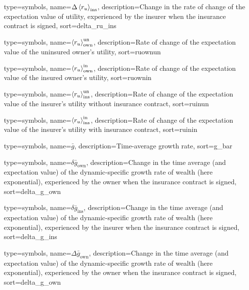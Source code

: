 {
 type={symbols}, 
 name={\ensuremath{\Delta \ave{r_u}_{\text{ins}}}},
 description={Change in the rate of change of the expectation value of utility, experienced by the insurer when the insurance contract is signed},
 sort=delta_ru_ins
}

{
  type={symbols}, 
  name={\ensuremath{\ave{r_u}_{\text{own}}^{\text{un}}}},
  description={Rate of change of the expectation value of the uninsured owner's utility},
  sort=ruownun
}

{
  type={symbols}, 
  name={\ensuremath{\ave{r_u}_{\text{own}}^{\text{in}}}},
  description={Rate of change of the expectation value of the insured owner's utility},
  sort=ruownin
}


{
  type={symbols}, 
  name={\ensuremath{\ave{r_u}_{\text{ins}}^{\text{un}}}},
  description={Rate of change of the expectation value of the insurer's utility without insurance contract},
  sort=ruinun
}

{
  type={symbols}, 
  name={\ensuremath{\ave{r_u}_{\text{ins}}^{\text{in}}}},
  description={Rate of change of the expectation value of the insurer's utility with insurance contract},
  sort=ruinin
}



{
  type={symbols}, 
  name={\ensuremath{\bar{g}}},
  description={Time-average growth rate},
  sort=g_bar
}


{
 type={symbols}, 
 name={\ensuremath{\delta \bar{g}_{\text{own}}}},
 description={Change in the time average (and expectation value) of the dynamic-specific growth rate of wealth (here exponential), experienced by the owner when the insurance contract is signed},
 sort=delta_g_own
}

{
 type={symbols}, 
 name={\ensuremath{\delta \bar{g}_{\text{ins}}}},
 description={Change in the time average (and expectation value) of the dynamic-specific growth rate of wealth (here exponential), experienced by the insurer when the insurance contract is signed},
 sort=delta_g_ins
}

{
 type={symbols}, 
 name={\ensuremath{\Delta \bar{g}_{\text{own}}}},
 description={Change in the time average (and expectation value) of the dynamic-specific growth rate of wealth (here exponential), experienced by the owner when the insurance contract is signed},
 sort=delta_g_own
}

